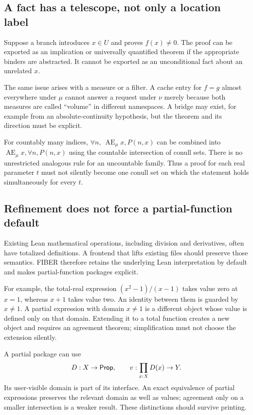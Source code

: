 \documentclass[11pt,letterpaper]{article}
\theoremstyle{definition}\newtheorem{definition}[theorem]{Definition}
\newcommand{\AEv}{\mathop{\mathrm{AE}}}
\begin{document}
\subsection{A fact has a telescope, not only a location label}
Suppose a branch introduces $x\in U$ and proves $f(x)\ne0$. The proof can be exported as an implication or universally quantified theorem if the appropriate binders are abstracted. It cannot be exported as an unconditional fact about an unrelated $x$.

The same issue arises with a measure or a filter. A cache entry for $f=g$ almost everywhere under $\mu$ cannot answer a request under $\nu$ merely because both measures are called ``volume'' in different namespaces. A bridge may exist, for example from an absolute-continuity hypothesis, but the theorem and its direction must be explicit.

For countably many indices, $\forall n,\ \AEv_\mu x, P(n,x)$ can be combined into $\AEv_\mu x,\forall n,P(n,x)$ using the countable intersection of conull sets. There is no unrestricted analogous rule for an uncountable family. Thus a proof for each real parameter $t$ must not silently become one conull set on which the statement holds simultaneously for every $t$.

\subsection{Refinement does not force a partial-function default}
Existing Lean mathematical operations, including division and derivatives, often have totalized definitions. A frontend that lifts existing files should preserve those semantics. FIBER therefore retains the underlying Lean interpretation by default and makes partial-function packages explicit.

For example, the total-real expression $(x^2-1)/(x-1)$ takes value zero at $x=1$, whereas $x+1$ takes value two. An identity between them is guarded by $x\ne1$. A partial expression with domain $x\ne1$ is a different object whose value is defined only on that domain. Extending it to a total function creates a new object and requires an agreement theorem; simplification must not choose the extension silently.

A partial package can use
\[
 D:X\to\mathsf{Prop},\qquad v:\prod_{x:X}D(x)\to Y.
\]
Its user-visible domain is part of its interface. An exact equivalence of partial expressions preserves the relevant domain as well as values; agreement only on a smaller intersection is a weaker result. These distinctions should survive printing.
\end{document}
